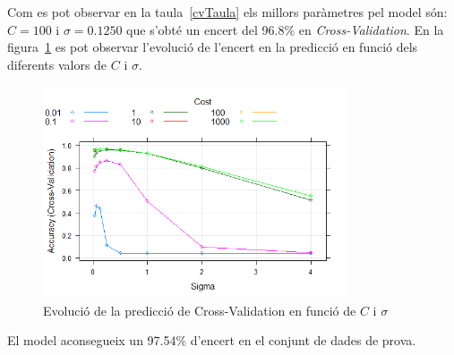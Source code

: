 Com es pot observar en la taula~\ref{cvTaula} els millors paràmetres pel model són: $C = 100$ i $\sigma = 0.1250$ que s'obté un encert del 96.8\% en \textit{Cross-Validation}. En la figura~\ref{fig:c_validation} es pot observar l'evolució de l'encert en la predicció en funció dels diferents valors de $C$ i $\sigma$.

\begin{figure}[H]
    \centering
    \includegraphics[width=0.8\textwidth]{img/SVMRBF_CV.png}
    \caption{Evolució de la predicció de Cross-Validation en funció de $C$ i $\sigma$}
    \label{fig:c_validation}
\end{figure} 

El model aconsegueix un 97.54\% d'encert en el conjunt de dades de prova.